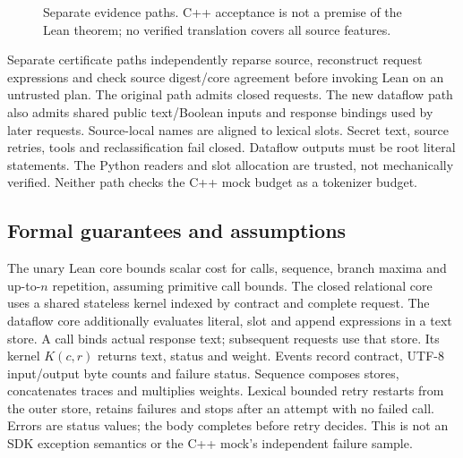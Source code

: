 \documentclass[preprint,12pt,a4paper]{elsarticle}
\begin{document}
\begin{figure}[!ht]
\centering
{}
\caption{Separate evidence paths. C++ acceptance is not a premise of the Lean
theorem; no verified translation covers all source features.}
\end{figure}

Separate certificate paths independently reparse source, reconstruct request
expressions and check source digest/core agreement before invoking Lean on an
untrusted plan. The original path admits closed requests. The new dataflow path
also admits shared public text/Boolean inputs and response bindings used by
later requests. Source-local names are aligned to lexical slots. Secret text,
source retries, tools and reclassification fail closed. Dataflow outputs must
be root literal statements. The Python readers and slot allocation are trusted,
not mechanically verified. Neither path checks the C++ mock budget as a
tokenizer budget.

\subsection{Formal guarantees and assumptions}
The unary Lean core bounds scalar cost for calls, sequence, branch maxima and
up-to-$n$ repetition, assuming primitive call bounds. The closed relational core
uses a shared stateless kernel indexed by contract and complete request. The
dataflow core additionally evaluates literal, slot and append expressions in a
text store. A call binds actual response text; subsequent requests use that
store. Its kernel $K(c,r)$ returns text, status and weight. Events record contract,
UTF-8 input/output byte counts and failure status. Sequence composes stores,
concatenates traces and multiplies weights. Lexical bounded retry restarts from
the outer store, retains failures and stops after an attempt with no failed
call. Errors are status values; the body completes before retry decides. This
is not an SDK exception semantics or the C++ mock's independent failure sample.
\end{document}
